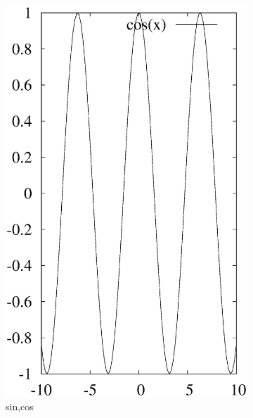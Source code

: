 \documentclass[journal=jacsat,manuscript=article]{achemso}
\begin{document}
\begin{figure}[ht]
\begin{subfigure}{0.3\textwidth}
\includegraphics [width=\textwidth]{cos.eps}
\caption{sin,cos}
\end{subfigure}
\begin{subfigure}{0.3\textwidth}

\end{subfigure}
\end{figure}
\end{document}

